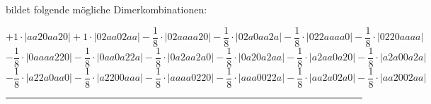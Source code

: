 \documentclass{article}
\begin{document}
\begin{minipage}{\linewidth}
 bildet folgende mögliche Dimerkombinationen:

$$+ 1 \cdot \left|aa20aa20 \right| + 1 \cdot \left|02aa02aa \right| - \frac{1}{8} \cdot \left|02aaaa20 \right| - \frac{1}{8} \cdot \left|02a0aa2a \right| - \frac{1}{8} \cdot \left|022aaaa0 \right| - \frac{1}{8} \cdot \left|0220aaaa \right|  $$ $$ - \frac{1}{8} \cdot \left|0aaaa220 \right| - \frac{1}{8} \cdot \left|0aa0a22a \right| - \frac{1}{8} \cdot \left|0a2aa2a0 \right| - \frac{1}{8} \cdot \left|0a20a2aa \right| - \frac{1}{8} \cdot \left|a2aa0a20 \right| - \frac{1}{8} \cdot \left|a2a00a2a \right|  $$ $$ - \frac{1}{8} \cdot \left|a22a0aa0 \right| - \frac{1}{8} \cdot \left|a2200aaa \right| - \frac{1}{8} \cdot \left|aaaa0220 \right| - \frac{1}{8} \cdot \left|aaa0022a \right| - \frac{1}{8} \cdot \left|aa2a02a0 \right| - \frac{1}{8} \cdot \left|aa2002aa \right| $$



\end{minipage}
\vspace{0.5cm}
\hrule
\vspace{0.5cm}
\end{document}
